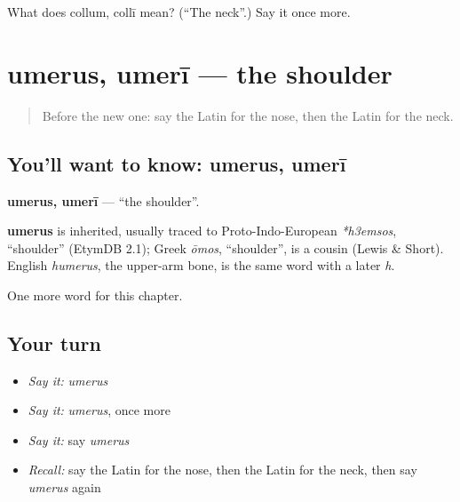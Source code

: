 \begin{tcolorbox}[breakable,colback=teal!4,colframe=teal!35!black,title={Before you move on}]
What does collum, collī mean? (\textquotedblleft{}The neck\textquotedblright{}.) Say it once more.
\end{tcolorbox}
\section[umerus, umerī]{umerus, umerī — the shoulder}

\label{lesson:LA-C64-umerus}



\begin{quote}
Before the new one: say the Latin for the nose, then the Latin for the neck.
\end{quote}

\subsection*{You'll want to know: umerus, umerī}
\textbf{umerus, umerī} — \textquotedblleft{}the shoulder\textquotedblright{}.

\begin{cousinweb}
\textbf{umerus} is inherited, usually traced to Proto-Indo-European \emph{*h3emsos}, \textquotedblleft{}shoulder\textquotedblright{} (EtymDB 2.1); Greek \emph{ōmos}, \textquotedblleft{}shoulder\textquotedblright{}, is a cousin (Lewis \& Short). English \emph{humerus}, the upper-arm bone, is the same word with a later \emph{h}.
\end{cousinweb}

\begin{grammarlens}[title={What you've built}]
One more word for this chapter.
\end{grammarlens}

\subsection*{Your turn}
\begin{itemize}
\raggedright
  \item \emph{Say it:} \emph{umerus}
  \item \emph{Say it:} \emph{umerus}, once more
  \item \emph{Say it:} say \emph{umerus}
  \item \emph{Recall:} say the Latin for the nose, then the Latin for the neck, then say \emph{umerus} again
\end{itemize}

